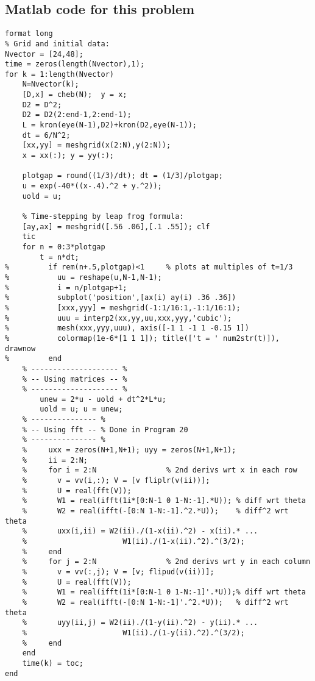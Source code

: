 \subsection*{Matlab code for this problem}
\begin{verbatim}
format long
% Grid and initial data:
Nvector = [24,48];
time = zeros(length(Nvector),1);
for k = 1:length(Nvector)
    N=Nvector(k);
    [D,x] = cheb(N);  y = x;
    D2 = D^2;
    D2 = D2(2:end-1,2:end-1);
    L = kron(eye(N-1),D2)+kron(D2,eye(N-1));
    dt = 6/N^2;
    [xx,yy] = meshgrid(x(2:N),y(2:N));
    x = xx(:); y = yy(:);

    plotgap = round((1/3)/dt); dt = (1/3)/plotgap;
    u = exp(-40*((x-.4).^2 + y.^2));
    uold = u; 

    % Time-stepping by leap frog formula:
    [ay,ax] = meshgrid([.56 .06],[.1 .55]); clf
    tic
    for n = 0:3*plotgap
        t = n*dt;
%         if rem(n+.5,plotgap)<1     % plots at multiples of t=1/3
%           uu = reshape(u,N-1,N-1);
%           i = n/plotgap+1;
%           subplot('position',[ax(i) ay(i) .36 .36])
%           [xxx,yyy] = meshgrid(-1:1/16:1,-1:1/16:1);
%           uuu = interp2(xx,yy,uu,xxx,yyy,'cubic');
%           mesh(xxx,yyy,uuu), axis([-1 1 -1 1 -0.15 1])
%           colormap(1e-6*[1 1 1]); title(['t = ' num2str(t)]), drawnow
%         end
    % -------------------- %    
    % -- Using matrices -- %
    % -------------------- %    
        unew = 2*u - uold + dt^2*L*u; 
        uold = u; u = unew;
    % --------------- %
    % -- Using fft -- % Done in Program 20
    % --------------- %
    %     uxx = zeros(N+1,N+1); uyy = zeros(N+1,N+1);
    %     ii = 2:N;
    %     for i = 2:N                % 2nd derivs wrt x in each row
    %       v = vv(i,:); V = [v fliplr(v(ii))];
    %       U = real(fft(V));
    %       W1 = real(ifft(1i*[0:N-1 0 1-N:-1].*U)); % diff wrt theta
    %       W2 = real(ifft(-[0:N 1-N:-1].^2.*U));    % diff^2 wrt theta
    %       uxx(i,ii) = W2(ii)./(1-x(ii).^2) - x(ii).* ... 
    %                      W1(ii)./(1-x(ii).^2).^(3/2);
    %     end
    %     for j = 2:N                % 2nd derivs wrt y in each column
    %       v = vv(:,j); V = [v; flipud(v(ii))];
    %       U = real(fft(V));
    %       W1 = real(ifft(1i*[0:N-1 0 1-N:-1]'.*U));% diff wrt theta   
    %       W2 = real(ifft(-[0:N 1-N:-1]'.^2.*U));   % diff^2 wrt theta
    %       uyy(ii,j) = W2(ii)./(1-y(ii).^2) - y(ii).* ...
    %                      W1(ii)./(1-y(ii).^2).^(3/2);
    %     end
    end
    time(k) = toc;
end
\end{verbatim}